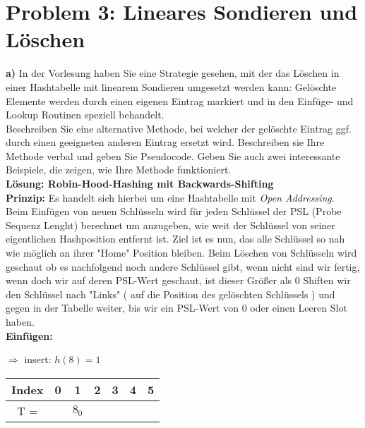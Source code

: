 \section*{Problem 3: Lineares Sondieren und Löschen} 


\noindent
\textbf{a)} In der Vorlesung haben Sie eine Strategie gesehen, mit der das Löschen in einer Hashtabelle mit linearem Sondieren umgesetzt werden kann: Gelöschte Elemente werden durch einen eigenen Eintrag markiert und in den Einfüge- und Lookup Routinen speziell behandelt.\\
Beschreiben Sie eine alternative Methode, bei welcher der gelöschte Eintrag ggf. durch einen geeigneten anderen Eintrag ersetzt wird. Beschreiben sie Ihre Methode verbal und geben Sie Pseudocode. Geben Sie auch zwei interessante Beispiele, die zeigen, wie Ihre Methode funktioniert.\\

\noindent
\textbf{Lösung: Robin-Hood-Hashing mit Backwards-Shifting}\\

\textbf{Prinzip:} Es handelt sich hierbei um eine Hashtabelle mit \textit{Open Addressing}.\\
Beim Einfügen von neuen Schlüsseln wird für jeden Schlüssel der PSL (Probe Sequenz Lenght) berechnet um anzugeben, wie weit der Schlüssel von seiner eigentlichen Hashposition entfernt ist. Ziel ist es nun, das alle Schlüssel so nah wie möglich an ihrer "Home" Position bleiben. Beim Löschen von Schlüsseln wird geschaut ob es nachfolgend noch andere Schlüssel gibt, wenn nicht sind wir fertig, wenn doch wir auf deren PSL-Wert geschaut, ist dieser Größer als 0 Shiften wir den Schlüssel nach "Links" ( auf die Position des gelöschten Schlüssels ) und gegen in der Tabelle weiter, bis wir ein PSL-Wert von 0 oder einen Leeren Slot haben.\\

\noindent
\textbf{Einfügen:}

$\Rightarrow$ insert: $h(8)=1$
\begin{center}
\begin{tabular}{|c|c|c|c|c|c|c|}
\hline
Index & 0 & 1 & 2 & 3 & 4 & 5\\
\hline
T = & & $8_0$ & & & &\\
\hline
\end{tabular}
\end{center}


